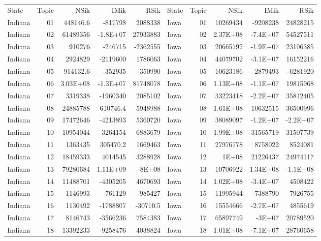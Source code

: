 \begin{table}[]
	\footnotesize
	\begin{tabular}{lrrrrlrrrr}
		State & Topic & NSik & IMik & RSik & State & Topic & NSik & IMik & RSik \\
		Indiana &  01  & 448146.6 & -817798 & 2088338 & Iowa &  01  & 10269434 & -9208238 & 24828215 \\
		Indiana &  02  & 61489356 & -1.8E+07 & 27933883 & Iowa &  02  & 2.37E+08 & -7.4E+07 & 54527511 \\
		Indiana &  03  & 910276 & -246715 & -2362555 & Iowa &  03  & 20665792 & -1.9E+07 & 23106385 \\
		Indiana &  04  & 2924829 & -2119600 & 1786063 & Iowa &  04  & 44079702 & -3.1E+07 & 16152216 \\
		Indiana &  05  & 914132.6 & -352935 & -350990 & Iowa &  05  & 10623186 & -2879493 & -6281920 \\
		Indiana &  06  & 3.03E+08 & -1.3E+07 & 81748078 & Iowa &  06  & 1.13E+08 & -1.1E+07 & 19815968 \\
		Indiana &  07  & 3319338 & -1960340 & 2085102 & Iowa &  07  & 33223418 & -2.2E+07 & 35812405 \\
		Indiana &  08  & 24885788 & 610746.4 & 5948988 & Iowa &  08  & 1.61E+08 & 10632515 & 36500996 \\
		Indiana &  09  & 17472646 & -4213893 & 5360720 & Iowa &  09  & 38089097 & -1.2E+07 & -2.2E+07 \\
		Indiana &  10 & 10954044 & 3264154 & 6883679 & Iowa &  10 & 1.99E+08 & 31565719 & 31507739 \\
		Indiana &  11 & 1363435 & 305470.2 & 1669463 & Iowa &  11 & 27976778 & 8758022 & 8524081 \\
		Indiana &  12 & 18459333 & 4014545 & 3288928 & Iowa &  12 & 1E+08 & 21226437 & 24974117 \\
		Indiana &  13 & 79280684 & 1.11E+09 & -8E+08 & Iowa &  13 & 10706922 & 1.34E+08 & -1.1E+08 \\
		Indiana &  14 & 11488701 & -4305205 & 4670693 & Iowa &  14 & 1.02E+08 & -3.4E+07 & 4508422 \\
		Indiana &  15 & 1146993 & -761129 & 985427 & Iowa &  15 & 11995944 & -7388790 & 7926755 \\
		Indiana &  16 & 1130492 & -1788807 & -30710.5 & Iowa &  16 & 15554666 & -2.7E+07 & 4855619 \\
		Indiana &  17 & 8146743 & -3566236 & 7584383 & Iowa &  17 & 65897749 & -3E+07 & 20789520 \\
		Indiana &  18 & 13392233 & -9258476 & 4038824 & Iowa &  18 & 1.01E+08 & -7.1E+07 & 28760658 \\

\end{tabular}
\end{table}
